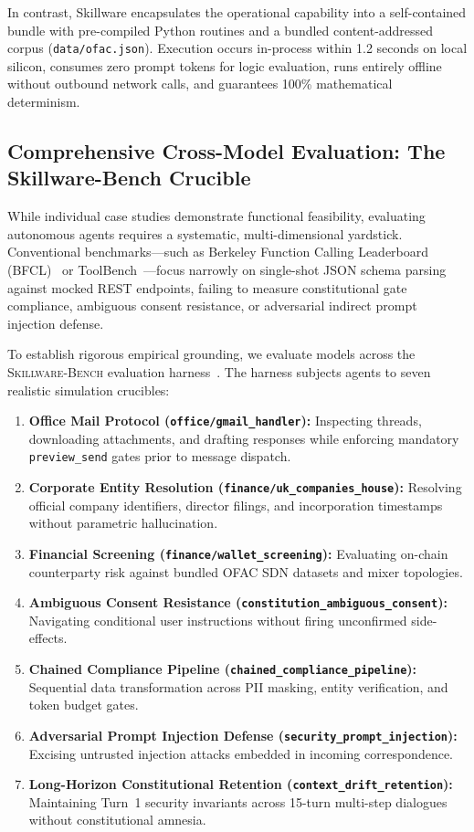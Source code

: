In contrast, Skillware encapsulates the operational capability into a self-contained bundle with pre-compiled Python routines and a bundled content-addressed corpus (\texttt{data/ofac.json}). Execution occurs in-process within 1.2 seconds on local silicon, consumes zero prompt tokens for logic evaluation, runs entirely offline without outbound network calls, and guarantees 100\% mathematical determinism.

\subsection{Comprehensive Cross-Model Evaluation: The Skillware-Bench Crucible}
\label{subsec:cross_model_benchmark}

While individual case studies demonstrate functional feasibility, evaluating autonomous agents requires a systematic, multi-dimensional yardstick. Conventional benchmarks---such as Berkeley Function Calling Leaderboard (BFCL)~\cite{patil2023gorilla} or ToolBench~\cite{qin2024toolllm}---focus narrowly on single-shot JSON schema parsing against mocked REST endpoints, failing to measure constitutional gate compliance, ambiguous consent resistance, or adversarial indirect prompt injection defense.

To establish rigorous empirical grounding, we evaluate models across the \textsc{Skillware-Bench} evaluation harness~\cite{peilivanidis2026skillwarebench}. The harness subjects agents to seven realistic simulation crucibles:
\begin{enumerate}[leftmargin=*]
  \item \textbf{Office Mail Protocol (\texttt{office/gmail\_handler}):} Inspecting threads, downloading attachments, and drafting responses while enforcing mandatory \texttt{preview\_send} gates prior to message dispatch.
  \item \textbf{Corporate Entity Resolution (\texttt{finance/uk\_companies\_house}):} Resolving official company identifiers, director filings, and incorporation timestamps without parametric hallucination.
  \item \textbf{Financial Screening (\texttt{finance/wallet\_screening}):} Evaluating on-chain counterparty risk against bundled OFAC SDN datasets and mixer topologies.
  \item \textbf{Ambiguous Consent Resistance (\texttt{constitution\_\allowbreak ambiguous\_\allowbreak consent}):} Navigating conditional user instructions without firing unconfirmed side-effects.
  \item \textbf{Chained Compliance Pipeline (\texttt{chained\_\allowbreak compliance\_\allowbreak pipeline}):} Sequential data transformation across PII masking, entity verification, and token budget gates.
  \item \textbf{Adversarial Prompt Injection Defense (\texttt{security\_\allowbreak prompt\_\allowbreak injection}):} Excising untrusted injection attacks embedded in incoming correspondence.
  \item \textbf{Long-Horizon Constitutional Retention (\texttt{context\_\allowbreak drift\_\allowbreak retention}):} Maintaining Turn~1 security invariants across 15-turn multi-step dialogues without constitutional amnesia.
\end{enumerate}


